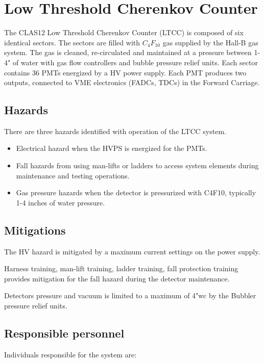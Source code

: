 \section{Low Threshold Cherenkov Counter}

The CLAS12 Low Threshold Cherenkov Counter (LTCC) is composed of six identical sectors. The sectors are filled 
with $C_4F_{10}$ gas supplied by the Hall-B gas system. The gas is cleaned, re-circulated and maintained at a pressure between 1-4" of water
with gas flow controllers and bubble pressure relief units.
Each sector contains 36 PMTs energized by a HV power supply. Each PMT produces two outputs, 
connected to VME electronics (FADCs, TDCs) in the Forward Carriage.


\subsection{Hazards} 

There are three hazards identified with operation of the LTCC system. 
\begin{itemize}
\item Electrical hazard when the HVPS is energized for the PMTs.
\item Fall hazards from using man-lifts or ladders to access system elements during maintenance and testing operations. 
\item Gas pressure hazards when the detector is pressurized with C4F10, typically 1-4 inches of water pressure.
\end{itemize}

\subsection{Mitigations}

The HV hazard is mitigated by a maximum current settings on the power supply.

Harness training, man-lift training, ladder training, fall protection training provides mitigation for the fall hazard during the detector maintenance.

Detectors pressure and vacuum is limited to a maximum of 4"wc by the Bubbler pressure relief units.


\subsection{Responsible personnel}

Individuals responsible for the system are:

